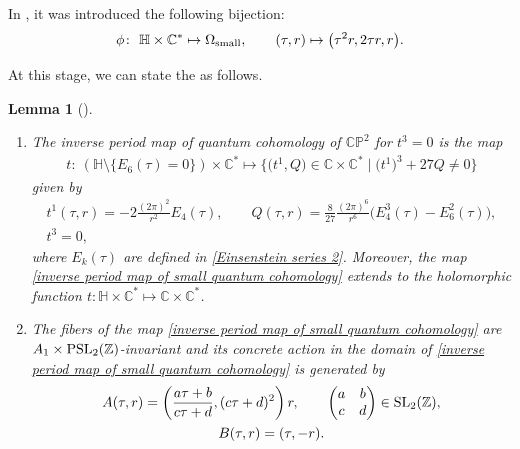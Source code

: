 \documentclass[11pt]{article}
\numberwithin{equation}{section}
\numberwithin{equation}{section}
\newtheorem{Lemma}[Theorem]{Lemma}
\begin{document}
In \cite[Section 2.3]{Milanov}, it was introduced the following bijection:
\[%
\phi\colon\ \mathbb{H}\times \mathbb{C}^{*} \mapsto \Omega_{\rm small},\qquad
(\tau,r) \mapsto \bigl(\tau^2r,2\tau r, r\bigr).
\]

At this stage, we can state the \cite[Theorem 2.3]{Milanov} as follows.

\begin{Lemma}[{\cite{Milanov}}]\label{Lemma Milanov affine small quantum cohomology}\quad
\begin{enumerate}\itemsep=0pt
\item[$(1)$]
The inverse period map of quantum cohomology of $\mathbb{CP}^2$ for $t^3=0$ is the map
\begin{gather*}
t\colon\ (\mathbb{H}\setminus\{E_6(\tau)=0 \})\times \mathbb{C}^{*} \mapsto \bigl\{ \bigl(t^1,Q\bigr) \in \mathbb{C}\times \mathbb{C}^{*} \mid \bigl(t^1\bigr)^3+27Q\neq 0\bigr\}
\end{gather*}
given by
\begin{gather}
t^1(\tau,r)=-2\frac{ (2\pi )^2}{r^2} E_4(\tau) ,\qquad
Q(\tau,r)=\frac{8}{27}\frac{(2\pi)^6 }{r^6} \bigl(E_4^3(\tau)-E_6^2(\tau) \bigr) ,\nonumber\\
t^3=0,\label{inverse period map of small quantum cohomology}
\end{gather}
where $E_k(\tau)$ are defined in \eqref{Einsenstein series 2}. Moreover, the map \eqref{inverse period map of small quantum cohomology} extends to the holomorphic function
$
t\colon \mathbb{H}\times \mathbb{C}^{*} \mapsto \mathbb{C}\times \mathbb{C}^{*}$.
\item[$(2)$]
The fibers of the map \eqref{inverse period map of small quantum cohomology} are $A_1\times {\rm PSL}_2(\mathbb{Z})$-invariant and its concrete action in the domain of \eqref{inverse period map of small quantum cohomology} is generated by
\begin{gather}
A(\tau,r)=\left( \frac{a\tau+b}{c\tau+d} , (c\tau+d)^2\right)r,\qquad {\begin{pmatrix}
a& b \\
c& d \\
\end{pmatrix}} \in {\rm SL}_2(\mathbb{Z}),\nonumber\\
B(\tau,r)=( \tau , -r).\label{Monodromy action affine small quantum cohomology}
\end{gather}
\end{enumerate}
\end{Lemma}
\end{document}
